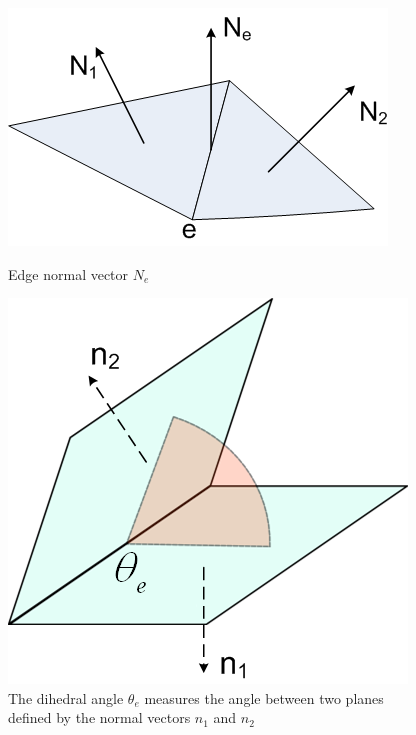 \documentclass[11pt]{article}
\begin{document}
\begin{figure}[htbp]
  \begin{minipage}[b]{0.45\linewidth}
	\centering
	\includegraphics[width=\textwidth]{curvature.png}
	\caption{Edge normal vector $N_e$}
	\label{fig:curvature}
  \end{minipage}
  \hspace{0.5cm}
  \begin{minipage}[b]{0.45\linewidth}
    \centering
    \includegraphics[width=\linewidth]{dihedral.png}
    \caption{The dihedral angle $\theta_e$ measures the angle between two planes defined by the normal vectors $n_1$ and $n_2$}
    \label{fig:dihedral}
  \end{minipage}
\end{figure}
\end{document}
